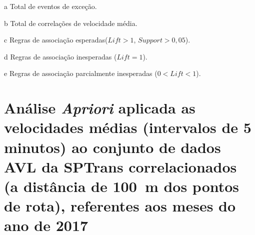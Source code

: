 \documentclass[
	12pt,				%
	oneside,			%
	a4paper,			%
	english,			%
	brazil				%
	]{abntex2ppgsi}
\begin{document}
{{{\begin{apendicesenv}
\begin{table}[!htb]
\begin{threeparttable}
\begin{tablenotes}
            \item[a] Total de eventos de exceção.
            \item[b] Total de correlações de velocidade média.
            \item[c] Regras de associação esperadas($Lift > 1$, $Support > 0,05$).
            \item[d] Regras de associação inesperadas ($Lift = 1$).
            \item[e] Regras de associação parcialmente inesperadas ($0 < Lift < 1$).
        \end{tablenotes}
\end{threeparttable}
\end{table}

\clearpage

\section{Análise \textit{Apriori} aplicada as velocidades médias (intervalos de 5 minutos) ao conjunto de dados AVL da SPTrans correlacionados (a distância de 100~m dos pontos de rota), referentes aos meses do ano de 2017}
\label{g5}


\end{apendicesenv}}}}
\end{document}
